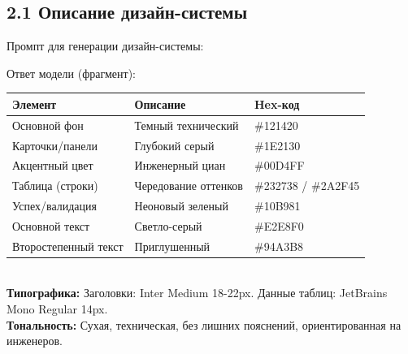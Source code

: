 \documentclass[oneside,a4paper,14pt]{extarticle}
\begin{document}
	\subsection*{2.1 Описание дизайн-системы}
	\noindent
	Промпт для генерации дизайн-системы:
	
	\newpage
	\noindent
	Ответ модели (фрагмент):\\
	\begin{tabular}{|l|l|l|}
		\hline
		\textbf{Элемент} & \textbf{Описание} & \textbf{Hex-код} \\ \hline
		Основной фон & Темный технический & \#121420 \\ \hline
		Карточки/панели & Глубокий серый & \#1E2130 \\ \hline
		Акцентный цвет & Инженерный циан & \#00D4FF \\ \hline
		Таблица (строки) & Чередование оттенков & \#232738 / \#2A2F45 \\ \hline
		Успех/валидация & Неоновый зеленый & \#10B981 \\ \hline
		Основной текст & Светло-серый & \#E2E8F0 \\ \hline
		Второстепенный текст & Приглушенный & \#94A3B8 \\ \hline
	\end{tabular} \\
	\noindent
	\textbf{Типографика:} Заголовки: Inter Medium 18-22px. Данные таблиц: JetBrains Mono Regular 14px.\\
	\textbf{Тональность:} Сухая, техническая, без лишних пояснений, ориентированная на инженеров.
\end{document}
